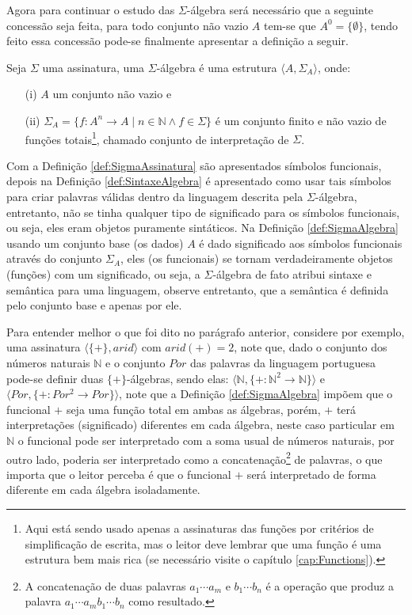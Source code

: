 Agora para continuar o estudo das $\Sigma$-álgebra será necessário que a seguinte concessão seja feita, para todo conjunto não vazio $A$ tem-se que $A^0 = \{\emptyset\}$, tendo feito essa concessão pode-se finalmente apresentar a definição a seguir.

\begin{definicao}\label{def:SigmaAlgebra}
  Seja $\Sigma$ uma assinatura, uma $\Sigma$-álgebra é uma estrutura $\langle A, \Sigma_A \rangle$, onde:
  \begin{itemize}
    \item[(i)] $A$ um conjunto não vazio e 
    \item[(ii)] $\Sigma_A = \{f: A^n \rightarrow A  \mid n \in \mathbb{N} \land f \in \Sigma\}$ é um conjunto finito e não vazio de funções totais\footnote{Aqui está sendo usado apenas a assinaturas das funções por critérios de simplificação de escrita, mas o leitor deve lembrar que uma função é uma estrutura bem mais rica (se necessário visite o capítulo \ref{cap:Functions}).}, chamado conjunto de interpretação de $\Sigma$.
  \end{itemize}
\end{definicao}

Com a Definição \ref{def:SigmaAssinatura} são apresentados símbolos funcionais, depois na Definição \ref{def:SintaxeAlgebra} é apresentado como usar tais símbolos para criar palavras válidas dentro da linguagem descrita pela $\Sigma$-álgebra, entretanto, não se tinha qualquer tipo de significado para os símbolos funcionais, ou seja, eles eram objetos puramente sintáticos. Na Definição \ref{def:SigmaAlgebra} usando um conjunto base (os dados) $A$ é dado significado aos símbolos funcionais através do conjunto $\Sigma_A$, eles (os funcionais) se tornam verdadeiramente objetos (funções) com um significado, ou seja, a $\Sigma$-álgebra de fato atribui sintaxe e semântica para uma linguagem, observe entretanto, que a semântica é definida pelo conjunto base e apenas por ele. 

Para entender melhor o que foi dito no parágrafo anterior, considere por exemplo, uma assinatura $\langle \{+\}, arid \rangle$ com $arid(+)  = 2$, note que, dado o conjunto dos números naturais $\mathbb{N}$ e o conjunto $Por$ das palavras da linguagem portuguesa pode-se definir duas $\{+\}$-álgebras, sendo elas: $\langle \mathbb{N}, \{+ :\mathbb{N}^2 \rightarrow \mathbb{N}\} \rangle$ e $\langle Por, \{+ :Por^2 \rightarrow Por\} \rangle$, note que a Definição \ref{def:SigmaAlgebra} impõem que o funcional $+$ seja uma função total em ambas as álgebras, porém, $+$ terá interpretações (significado) diferentes em cada álgebra, neste caso particular em $\mathbb{N}$ o funcional pode ser interpretado com a soma usual de números naturais, por outro lado, poderia ser interpretado como a concatenação\footnote{A concatenação de duas palavras $a_1\cdots a_m$ e $b_1\cdots b_n$ é a operação que produz a palavra $a_1\cdots a_mb_1\cdots b_n$ como resultado.} de palavras, o que importa que o leitor perceba é que o funcional $+$ será interpretado de forma diferente em cada álgebra isoladamente.

